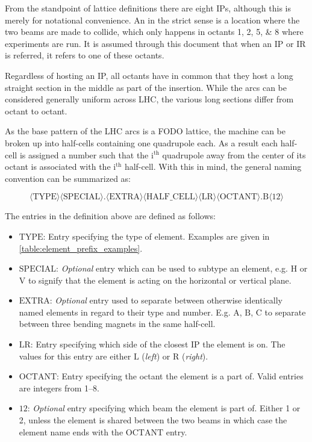 From the standpoint of lattice definitions there are eight IPs, although this is merely for notational convenience. 
An  in the strict sense is a location where the two beams are made to collide, which only happens in octants \numlist{1;2;5;8} where experiments are run.
It is assumed through this document that when an IP or IR is referred, it refers to one of these octants.

Regardless of hosting an IP, all octants have in common that they host a long straight section in the middle as part of the insertion.
While the arcs can be considered generally uniform across LHC, the various long sections differ from octant to octant.

As the base pattern of the LHC arcs is a FODO lattice, the machine can be broken up into half-cells containing one quadrupole each.
As a result each half-cell is assigned a number such that the \(\mathrm{i^{th}}\) quadrupole away from the center of its octant is associated with the \(\mathrm{i^{th}}\) half-cell.
With this in mind, the general naming convention can be summarized as:

\begin{equation*}
        \langle \mathrm{TYPE} \rangle \langle \mathrm{SPECIAL} \rangle . \langle \mathrm{EXTRA} \rangle \langle \mathrm{HALF\_CELL} \rangle \langle \mathrm {LR} \rangle \langle \mathrm{OCTANT} \rangle . \mathrm{B} \langle \mathrm{12} \rangle
    \label{equation:lhc_naming_nomenclature}
\end{equation*}

The entries in the definition above are defined as follows:
\begin{itemize}
    \item \(\mathrm{TYPE}\): Entry specifying the type of element. Examples are given in \cref{table:element_prefix_examples}.
    \item \(\mathrm{SPECIAL}\): \textit{Optional} entry which can be used to subtype an element, e.g. \(\mathrm{H}\) or \(\mathrm{V}\) to signify that the element is acting on the horizontal or vertical plane.
    \item \(\mathrm{EXTRA}\): \textit{Optional} entry used to separate between otherwise identically named elements in regard to their type and number. E.g. \(\mathrm{A}\), \(\mathrm{B}\), \(\mathrm{C}\) to separate between three bending magnets in the same half-cell.
    \item \(\mathrm{LR}\): Entry specifying which side of the closest IP the element is on. The values for this entry are either \(\mathrm{L}\) (\textit{left}) or \(\mathrm{R}\) (\textit{right}).
    \item \(\mathrm{OCTANT}\): Entry specifying the octant the element is a part of. Valid entries are integers from \numrange{1}{8}.
    \item \(\mathrm{12}\): \textit{Optional} entry specifying which beam the element is part of. Either \num{1} or \num{2}, unless the element is shared between the two beams in which case the element name ends with the \(\mathrm{OCTANT}\) entry.
\end{itemize}


